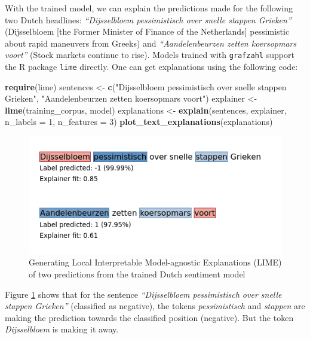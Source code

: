 \documentclass[
  english,
  man,floatsintext]{apa7}
\newenvironment{Shaded}{\begin{snugshade}}{\end{snugshade}}
\newcommand{\DataTypeTok}[1]{\textcolor[rgb]{0.13,0.29,0.53}{#1}}
\newcommand{\DecValTok}[1]{\textcolor[rgb]{0.00,0.00,0.81}{#1}}
\newcommand{\KeywordTok}[1]{\textcolor[rgb]{0.13,0.29,0.53}{\textbf{#1}}}
\newcommand{\NormalTok}[1]{#1}
\newcommand{\StringTok}[1]{\textcolor[rgb]{0.31,0.60,0.02}{#1}}
\begin{document}
With the trained model, we can explain the predictions made for the following two Dutch headlines: \emph{``Dijsselbloem pessimistisch over snelle stappen Grieken''} (Dijsselbloem {[}the Former Minister of Finance of the Netherlands{]} pessimistic about rapid maneuvers from Greeks) and \emph{``Aandelenbeurzen zetten koersopmars voort''} (Stock markets continue to rise). Models trained with \texttt{grafzahl} support the R package \texttt{lime} directly. One can get explanations using the following code:

\begin{Shaded}
\begin{Highlighting}[]
\KeywordTok{require}\NormalTok{(lime)}
\NormalTok{sentences \textless{}{-}}\StringTok{ }\KeywordTok{c}\NormalTok{(}\StringTok{"Dijsselbloem pessimistisch over snelle stappen Grieken"}\NormalTok{,}
               \StringTok{"Aandelenbeurzen zetten koersopmars voort"}\NormalTok{)}
\NormalTok{explainer \textless{}{-}}\StringTok{ }\KeywordTok{lime}\NormalTok{(training\_corpus, model)}
\NormalTok{explanations \textless{}{-}}\StringTok{ }\KeywordTok{explain}\NormalTok{(sentences, explainer, }\DataTypeTok{n\_labels =} \DecValTok{1}\NormalTok{,}
                        \DataTypeTok{n\_features =} \DecValTok{3}\NormalTok{)}
\KeywordTok{plot\_text\_explanations}\NormalTok{(explanations)}
\end{Highlighting}
\end{Shaded}

\begin{figure}
\includegraphics[width=1\linewidth]{fig1}
\caption{Generating Local Interpretable Model-agnostic Explanations (LIME) of two predictions from the trained Dutch sentiment model}
\label{fig:fig1}
\end{figure}

Figure \ref{fig:fig1} shows that for the sentence \emph{``Dijsselbloem pessimistisch over snelle stappen Grieken''} (classified as negative), the tokens \emph{pessimistisch} and \emph{stappen} are making the prediction towards the classified position (negative). But the token \emph{Dijsselbloem} is making it away.
\end{document}
